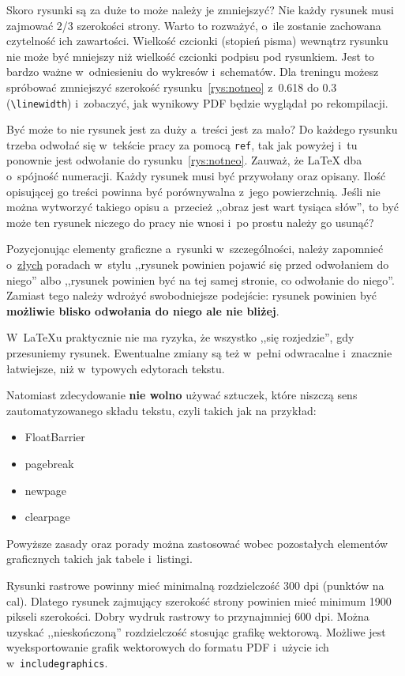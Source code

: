 Skoro rysunki są za duże to może należy je zmniejszyć? Nie każdy rysunek musi zajmować 2/3 szerokości strony. Warto to rozważyć, o~ile zostanie zachowana czytelność ich zawartości. Wielkość czcionki (stopień pisma) wewnątrz rysunku nie może być mniejszy niż wielkość czcionki podpisu pod rysunkiem. Jest to bardzo ważne w~odniesieniu do wykresów i~schematów. Dla treningu możesz spróbować zmniejszyć szerokość rysunku~\ref{rys:notneo} z~0.618 do 0.3 (\texttt{\textbackslash linewidth}) i~zobaczyć, jak wynikowy PDF będzie wyglądał po rekompilacji.

Być może to nie rysunek jest za duży a~treści jest za mało? Do każdego rysunku trzeba odwołać się w~tekście pracy za pomocą \texttt{ref}, tak jak powyżej i~tu ponownie jest odwołanie do rysunku~\ref{rys:notneo}. Zauważ, że \LaTeX{} dba o~spójność numeracji. Każdy rysunek musi być przywołany oraz opisany. Ilość opisującej go treści powinna być porównywalna z~jego powierzchnią. Jeśli nie można wytworzyć takiego opisu a~przecież ,,obraz jest wart tysiąca słów'', to być może ten rysunek niczego do pracy nie wnosi i~po prostu należy go usunąć?

Pozycjonując elementy graficzne a~rysunki w~szczególności, należy zapomnieć o~\underline{złych} poradach w~stylu ,,rysunek powinien pojawić się przed odwołaniem do niego'' albo ,,rysunek powinien być na tej samej stronie, co odwołanie do niego''. Zamiast tego należy wdrożyć swobodniejsze podejście: rysunek powinien być \textbf{możliwie blisko odwołania do niego ale nie bliżej}.

W~\LaTeX{u} praktycznie nie ma ryzyka, że wszystko ,,się rozjedzie'', gdy przesuniemy rysunek. Ewentualne zmiany są też w~pełni odwracalne i~znacznie łatwiejsze, niż w~typowych edytorach tekstu.

Natomiast zdecydowanie \textbf{nie wolno} używać sztuczek, które niszczą sens zautomatyzowanego składu tekstu, czyli takich jak na przykład:
\begin{itemize}
	\item FloatBarrier
	\item pagebreak
	\item newpage
	\item clearpage
\end{itemize}

Powyższe zasady oraz porady można zastosować wobec pozostałych elementów graficznych takich jak tabele i~listingi.

Rysunki rastrowe powinny mieć minimalną rozdzielczość 300 dpi (punktów na cal). Dlatego rysunek zajmujący szerokość strony powinien mieć minimum 1900 pikseli szerokości. Dobry wydruk rastrowy to przynajmniej 600 dpi. Można uzyskać ,,nieskończoną'' rozdzielczość stosując grafikę wektorową. Możliwe jest wyeksportowanie grafik wektorowych do formatu PDF i~użycie ich w~\texttt{includegraphics}.

